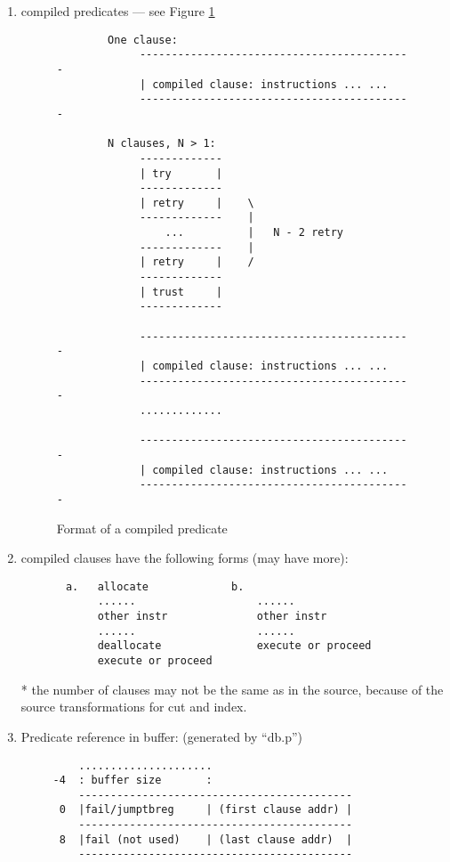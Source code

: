 \documentclass[11pt]{article}
\begin{document}
\begin{enumerate}
    \item compiled predicates --- see Figure \ref{f:cmppred}

\begin{figure}
\begin{verbatim}
        One clause:
             -------------------------------------------
             | compiled clause: instructions ... ...
             -------------------------------------------
   
        N clauses, N > 1:
             -------------
             | try       |
             -------------
             | retry     |    \
             -------------    |
                 ...          |   N - 2 retry
             -------------    |
             | retry     |    /
             -------------
             | trust     |
             -------------

             -------------------------------------------
             | compiled clause: instructions ... ...
             -------------------------------------------
             .............

             -------------------------------------------
             | compiled clause: instructions ... ...
             -------------------------------------------
\end{verbatim}
\caption{Format of a compiled predicate}
\label{f:cmppred}
\end{figure}

    \item compiled clauses have the following forms (may have more):
\begin{verbatim}
       a.   allocate             b.
            ......                   ......
            other instr              other instr
            ......                   ......
            deallocate               execute or proceed
            execute or proceed
\end{verbatim}

   * the number of clauses may not be the same as in the source,
     because of the source transformations for cut and index.

    \item Predicate reference in buffer: (generated by ``db.p'')
\label{pg:predref}

\begin{verbatim}
         .....................
     -4  : buffer size       :
         -------------------------------------------
      0  |fail/jumptbreg     | (first clause addr) |
         -------------------------------------------
      8  |fail (not used)    | (last clause addr)  |
         -------------------------------------------
\end{verbatim}


\end{enumerate}
\end{document}
